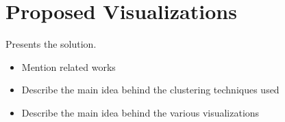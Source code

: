 \chapter{Proposed Visualizations}

Presents the solution.

\begin{itemize}
\item Mention related works
\item Describe the main idea behind the clustering techniques used
\item Describe the main idea behind the various visualizations
\end{itemize}
